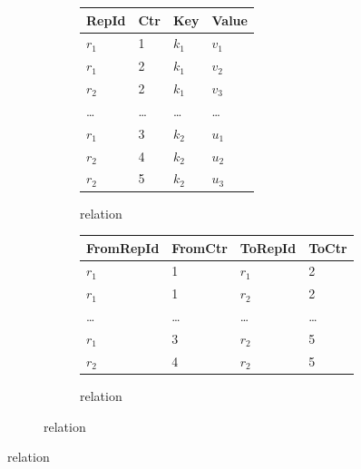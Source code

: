 \begin{figure}[htpb]
	\centering
	\small

	\begin{subfigure}[b]{\textwidth}
		\centering
		\begin{subfigure}[b]{0.45\textwidth}
			\centering
			\begin{tabular}{@{}llll@{}}
				\toprule
				RepId   & Ctr    & Key     & Value   \\
				\midrule
				\(r_1\) & 1      & \(k_1\) & \(v_1\) \\
				\(r_1\) & 2      & \(k_1\) & \(v_2\) \\
				\(r_2\) & 2      & \(k_1\) & \(v_3\) \\
				\midrule
				\ldots  & \ldots & \ldots  & \ldots  \\
				\midrule
				\(r_1\) & 3      & \(k_2\) & \(u_1\) \\
				\(r_2\) & 4      & \(k_2\) & \(u_2\) \\
				\(r_2\) & 5      & \(k_2\) & \(u_3\) \\
				\bottomrule
			\end{tabular}
			\caption{ relation}\label{fig:mvr-store-set}
		\end{subfigure}
		\hspace{1em}
		\begin{subfigure}[b]{0.45\textwidth}
			\centering
			\begin{tabular}{@{}llll@{}}
				\toprule
				FromRepId & FromCtr & ToRepId & ToCtr  \\
				\midrule
				\(r_1\)   & 1       & \(r_1\) & 2      \\
				\(r_1\)   & 1       & \(r_2\) & 2      \\
				\midrule
				\ldots    & \ldots  & \ldots  & \ldots \\
				\midrule
				\(r_1\)   & 3       & \(r_2\) & 5      \\
				\(r_2\)   & 4       & \(r_2\) & 5      \\
				\bottomrule
			\end{tabular}
			\caption{ relation}\label{fig:mvr-store-pred}
		\end{subfigure}
	\end{subfigure}

	\vspace{1em}


\end{figure}
